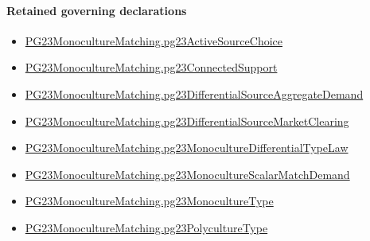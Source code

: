 \documentclass[10pt]{article}
\begin{document}
\paragraph{Retained governing declarations}
\begin{itemize}\raggedright
\item \hyperlink{governing-declaration-4682eea13b337715}{PG23\allowbreak{}Monoculture\allowbreak{}Matching.\allowbreak{}pg23\allowbreak{}Active\allowbreak{}Source\allowbreak{}Choice}
\item \hyperlink{paper-prerequisite-3ea91dd17eec5e64}{PG23\allowbreak{}Monoculture\allowbreak{}Matching.\allowbreak{}pg23\allowbreak{}Connected\allowbreak{}Support}
\item \hyperlink{paper-prerequisite-8862e3e199188580}{PG23\allowbreak{}Monoculture\allowbreak{}Matching.\allowbreak{}pg23\allowbreak{}Differential\allowbreak{}Source\allowbreak{}Aggregate\allowbreak{}Demand}
\item \hyperlink{paper-prerequisite-b0301ef9ff59e71b}{PG23\allowbreak{}Monoculture\allowbreak{}Matching.\allowbreak{}pg23\allowbreak{}Differential\allowbreak{}Source\allowbreak{}Market\allowbreak{}Clearing}
\item \hyperlink{paper-prerequisite-b89cd6c5c3c5cca3}{PG23\allowbreak{}Monoculture\allowbreak{}Matching.\allowbreak{}pg23\allowbreak{}Monoculture\allowbreak{}Differential\allowbreak{}Type\allowbreak{}Law}
\item \hyperlink{governing-declaration-274d8b14d2f0e612}{PG23\allowbreak{}Monoculture\allowbreak{}Matching.\allowbreak{}pg23\allowbreak{}Monoculture\allowbreak{}Scalar\allowbreak{}Match\allowbreak{}Demand}
\item \hyperlink{paper-prerequisite-b9706024b8c86426}{PG23\allowbreak{}Monoculture\allowbreak{}Matching.\allowbreak{}pg23\allowbreak{}Monoculture\allowbreak{}Type}
\item \hyperlink{paper-prerequisite-1b5614740ce1beb4}{PG23\allowbreak{}Monoculture\allowbreak{}Matching.\allowbreak{}pg23\allowbreak{}Polyculture\allowbreak{}Type}
\end{itemize}
\end{document}
